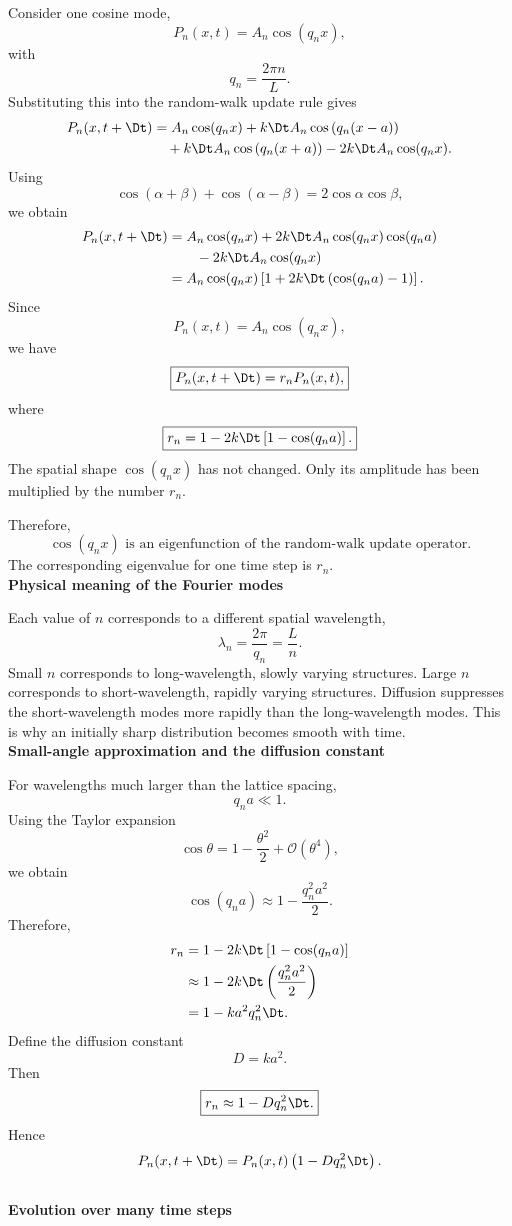 Consider one cosine mode,
\[
    P_n(x,t) = A_n\cos(q_nx),
\]
with
\[
    q_n = \frac{2\pi n}{L}.
\]
Substituting this into the random-walk update rule gives
\begin{align}
    P_n(x,t+\Dt) &= A_n \cos(q_nx) + k\Dt A_n \cos \left( q_n(x-a) \right)
    \nonumber\\
    &\quad + k\Dt A_n \cos \left( q_n(x+a) \right) - 2k\Dt A_n \cos(q_nx).
\end{align}
Using
\[
    \cos (\alpha + \beta) + \cos (\alpha - \beta) = 2 \cos \alpha \cos \beta,
\]
we obtain
\begin{align*}
    P_n(x,t+\Dt) &= A_n\cos(q_nx) + 2k\Dt A_n\cos(q_nx)\cos(q_na)
    \nonumber\\
    &\qquad - 2k\Dt A_n\cos(q_nx)
    \\
    &= A_n\cos(q_nx) \left[ 1+2k\Dt\left(\cos(q_na)-1\right) \right].
\end{align*}
Since
\[
    P_n(x,t) = A_n\cos(q_nx),
\]
we have
\[
\boxed{
    P_n(x,t+\Dt) = r_n P_n(x,t),
}
\]
where
\[
    \boxed{ 
        r_n = 1 - 2k\Dt \left[ 1-\cos(q_na) \right].
    }
\]
The spatial shape $\cos(q_nx)$ has not changed. 
Only its amplitude has been multiplied by the number $r_n$.

Therefore,
\[
\boxed{
    \cos(q_nx)
    \text{ is an eigenfunction of the random-walk update operator.}
}
\]
The corresponding eigenvalue for one time step is $r_n$.
% 
% 
\medskip
\\
\textbf{Physical meaning of the Fourier modes}

Each value of $n$ corresponds to a different spatial wavelength,
\[
    \lambda_n = \frac{2\pi}{q_n} = \frac{L}{n}.
\]
Small $n$ corresponds to long-wavelength, slowly varying structures. 
Large $n$ corresponds to short-wavelength, rapidly varying structures. 
Diffusion suppresses the short-wavelength modes more rapidly than the long-wavelength modes. 
This is why an initially sharp distribution becomes smooth with time.
% 
% 
\medskip
\\
\textbf{Small-angle approximation and the diffusion constant}

For wavelengths much larger than the lattice spacing,
\[
    q_na \ll 1.
\]
Using the Taylor expansion
\[
    \cos\theta = 1 - \frac{\theta^2}{2} + \mathcal{O}(\theta^4),
\]
we obtain
\[
    \cos(q_na) \approx 1 - \frac{q_n^2a^2}{2}.
\]
Therefore,
\begin{align*}
    r_n &= 1 - 2k\Dt \left[ 1-\cos(q_na) \right]
    \\
    &\approx 1 - 2k\Dt \left( \frac{q_n^2a^2}{2} \right)
    \\
    &= 1-ka^2q_n^2\Dt.
\end{align*}
Define the diffusion constant
\[
    \boxed{
        D = ka^2.
    }
\]
Then
\[
    \boxed{
        r_n \approx 1-Dq_n^2\Dt.
    }
\]
Hence
\[
    P_n(x,t + \Dt) = P_n(x,t) \left( 1 - Dq_n^2 \Dt \right).
\]
% 
% 
\medskip
\\
\textbf{Evolution over many time steps}

